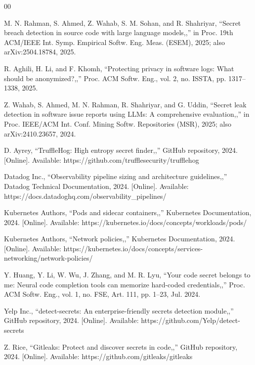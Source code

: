\documentclass[conference]{IEEEtran}
\begin{document}
\balance

\begin{thebibliography}{00}

M. N. Rahman, S. Ahmed, Z. Wahab, S. M. Sohan, and R. Shahriyar, ``Secret breach detection in source code with large language models,,'' in Proc. 19th ACM/IEEE Int. Symp. Empirical Softw. Eng. Meas. (ESEM), 2025; also arXiv:2504.18784, 2025.

R. Aghili, H. Li, and F. Khomh, ``Protecting privacy in software logs: What should be anonymized?,,'' Proc. ACM Softw. Eng., vol. 2, no. ISSTA, pp. 1317–1338, 2025.

Z. Wahab, S. Ahmed, M. N. Rahman, R. Shahriyar, and G. Uddin, ``Secret leak detection in software issue reports using LLMs: A comprehensive evaluation,,'' in Proc. IEEE/ACM Int. Conf. Mining Softw. Repositories (MSR), 2025; also arXiv:2410.23657, 2024.

D. Ayrey, ``TruffleHog: High entropy secret finder,,'' GitHub repository, 2024. [Online]. Available: https://github.com/trufflesecurity/trufflehog

Datadog Inc., ``Observability pipeline sizing and architecture guidelines,,'' Datadog Technical Documentation, 2024. [Online]. Available: https://docs.datadoghq.com/observability_pipelines/

Kubernetes Authors, ``Pods and sidecar containers,,'' Kubernetes Documentation, 2024. [Online]. Available: https://kubernetes.io/docs/concepts/workloads/pods/

Kubernetes Authors, ``Network policies,,'' Kubernetes Documentation, 2024. [Online]. Available: https://kubernetes.io/docs/concepts/services-networking/network-policies/

Y. Huang, Y. Li, W. Wu, J. Zhang, and M. R. Lyu, ``Your code secret belongs to me: Neural code completion tools can memorize hard-coded credentials,,'' Proc. ACM Softw. Eng., vol. 1, no. FSE, Art. 111, pp. 1–23, Jul. 2024.

Yelp Inc., ``detect-secrets: An enterprise-friendly secrets detection module,,'' GitHub repository, 2024. [Online]. Available: https://github.com/Yelp/detect-secrets

Z. Rice, ``Gitleaks: Protect and discover secrets in code,,'' GitHub repository, 2024. [Online]. Available: https://github.com/gitleaks/gitleaks


\end{thebibliography}
\end{document}
